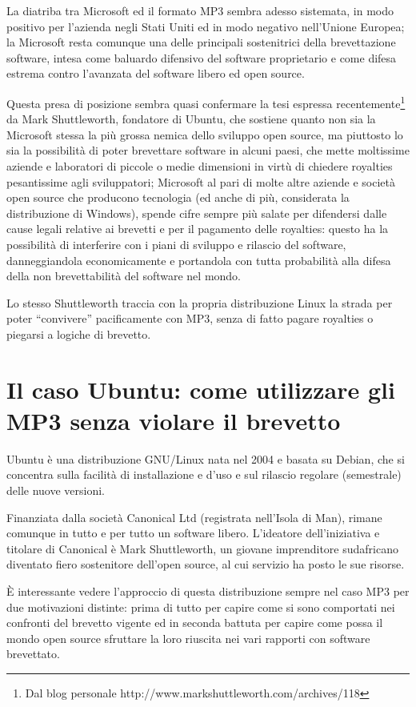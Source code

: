 La diatriba tra Microsoft ed il formato MP3 sembra adesso sistemata, in modo positivo per l'azienda negli Stati Uniti ed in modo negativo nell'Unione Europea; la Microsoft resta comunque una delle principali sostenitrici della brevettazione software, intesa come baluardo difensivo del software proprietario e come difesa estrema contro l'avanzata del software libero ed open source. 

Questa presa di posizione sembra quasi confermare la tesi espressa recentemente\footnote{Dal blog personale  http://www.markshuttleworth.com/archives/118} da Mark Shuttleworth, fondatore di Ubuntu, che sostiene quanto non sia la Microsoft stessa la più grossa nemica dello sviluppo open source, ma piuttosto lo sia la possibilità di poter brevettare software in alcuni paesi, che mette moltissime aziende e laboratori di piccole o medie dimensioni in virtù di chiedere royalties pesantissime agli sviluppatori; Microsoft al pari di molte altre aziende e società open source che producono tecnologia (ed anche di più, considerata la distribuzione di Windows), spende cifre sempre più salate per difendersi dalle cause legali relative ai brevetti e per il pagamento delle royalties: questo ha la possibilità di interferire con i piani di sviluppo e rilascio del software, danneggiandola economicamente e portandola con tutta probabilità alla difesa della non brevettabilità del software nel mondo.

Lo stesso Shuttleworth traccia con la propria distribuzione Linux la strada per poter ``convivere'' pacificamente con MP3, senza di fatto pagare royalties o piegarsi a logiche di brevetto.
\section{Il caso Ubuntu: come utilizzare gli MP3 senza violare il brevetto}
Ubuntu è una distribuzione GNU/Linux nata nel 2004 e basata su Debian, che si concentra sulla facilità di installazione e d'uso e sul rilascio regolare (semestrale) delle nuove versioni. 

Finanziata dalla società Canonical Ltd (registrata nell'Isola di Man), rimane comunque in tutto e per tutto un software libero. L'ideatore dell'iniziativa e titolare di Canonical è Mark Shuttleworth, un giovane imprenditore sudafricano diventato fiero sostenitore dell'open source, al cui servizio ha posto le sue risorse.

\`E interessante vedere l'approccio di questa distribuzione sempre nel caso MP3 per due motivazioni distinte: prima di tutto per capire come si sono comportati nei confronti del brevetto vigente ed in seconda battuta per capire come possa il mondo open source sfruttare la loro riuscita nei vari rapporti con software brevettato.

